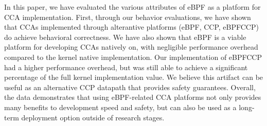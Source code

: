 \documentclass[../main.tex]{subfiles}
\begin{document}
In this paper, we have evaluated the various attributes of eBPF as a platform for CCA implementation. First, through our behavior evaluations, we have shown that CCAs implemented through alterantive platforms (eBPF, CCP, eBPFCCP) do achieve behavioral correctness. We have also shown that eBPF is a viable platform for developing CCAs natively on, with negligible performance overhead compared to the kernel native implementation. Our implementation of eBPFCCP had a higher performance overhead, but was still able to achieve a significant percentage of the full kernel implementation value. We believe this artifact can be useful as an alternative CCP datapath that provides safety guarantees. Overall, the data demonstrates that using eBPF-related CCA platforms not only provides many benefits to development speed and safety, but can also be used as a long-term deployment option outside of research stages. 
\end{document}
